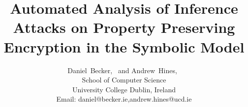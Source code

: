 \documentclass[journal]{IEEEtran}
\begin{document}
%
\title{Automated Analysis of Inference Attacks on Property Preserving Encryption in the Symbolic Model}
%
%

\author{Daniel~Becker,~ and Andrew~Hines,~\\
School of Computer Science\\University College Dublin, Ireland\\
 Email: daniel@becker.ie,andrew.hines@ucd.ie}
% 
%
\end{document}
